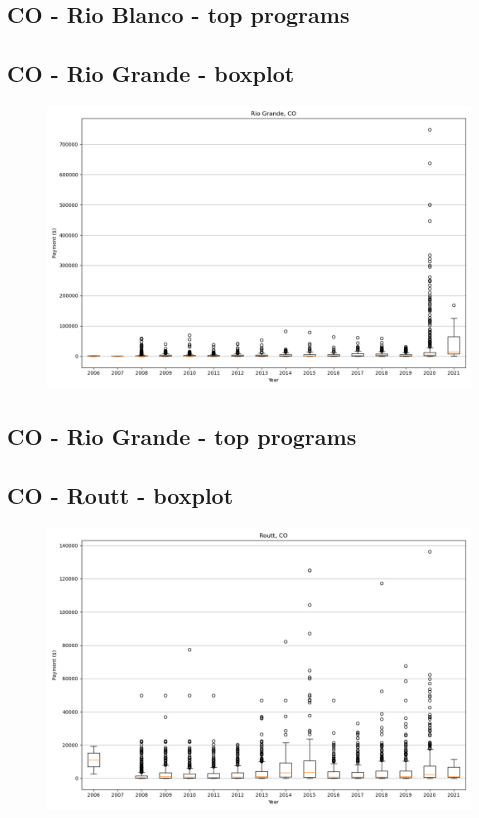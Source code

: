 \subsection*{CO - Rio Blanco - top programs}

\newpage
\subsection*{CO - Rio Grande - boxplot}
\begin{figure}[h]
\centering
\includegraphics[width=7in]{../output/boxplots/counties/Rio Grande-CO_boxplot.png}
\end{figure}


\subsection*{CO - Rio Grande - top programs}

\newpage
\subsection*{CO - Routt - boxplot}
\begin{figure}[h]
\centering
\includegraphics[width=7in]{../output/boxplots/counties/Routt-CO_boxplot.png}
\end{figure}


